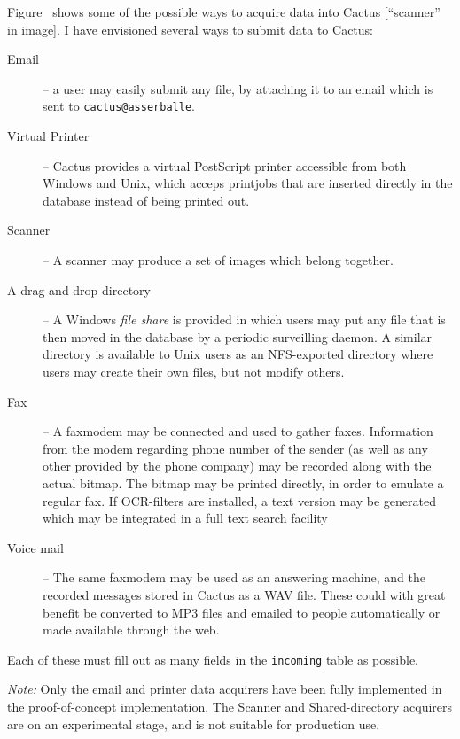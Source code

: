 Figure~ shows some of the possible ways to acquire
data into Cactus [\textsf{``scanner'' in image}].  I have envisioned
several ways to submit data to Cactus:

\begin{description}
\item[Email] -- a user may easily submit any file, by
  attaching it to an email which is sent to
  \texttt{cactus@asserballe}. 

\item[Virtual Printer] -- Cactus provides a virtual
  PostScript printer accessible from both Windows and Unix,
  which acceps printjobs that are inserted directly in the
  database instead of being printed out.

\item[Scanner] -- A scanner may produce a set of images
  which belong together.  

\item[A drag-and-drop directory] -- A Windows \textit{file share} is provided
in which users may put any file that is then moved in the database by a
periodic surveilling daemon.  A similar directory is available to Unix users as
an NFS-exported directory where users may create their own files, but not
modify others.  


\item[Fax] -- A faxmodem may be connected and used to gather
  faxes.  Information from the modem regarding phone number
  of the sender (as well as any other provided by the phone
  company) may be recorded along with the actual bitmap.
  The bitmap may be printed directly, in order to emulate a
  regular fax.  If OCR-filters are installed, a text
  version may be generated which may be integrated in a full
  text search facility
  
\item[Voice mail] -- The same faxmodem may be used as an
  answering machine, and the recorded messages stored in
  Cactus as a WAV file.  These could with great benefit be
  converted to MP3 files and emailed to people automatically or made available through the web. 

\end{description}

Each of these must fill out as many fields in the
\texttt{incoming} table as possible.  

\textit{Note:} Only the email and printer data acquirers have been fully
implemented in the proof-of-concept implementation.  The Scanner and
Shared-directory acquirers are on an experimental stage, and is not suitable
for production use.


